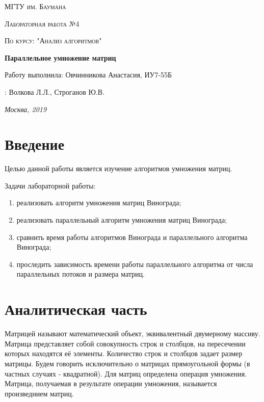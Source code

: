 \documentclass[a4paper,14pt]{report}
\begin{document}
\begin{titlepage}
	\centering
	{\scshape\LARGE МГТУ им. Баумана \par}
	\vspace{3cm}
	{\scshape\Large Лабораторная работа №4\par}
	\vspace{0.5cm}
	{\scshape\Large По курсу: "Анализ алгоритмов"\par}
	\vspace{1.5cm}
	{\huge\bfseries Параллельное умножение матриц\par}
	\vspace{2cm}
	\Large Работу выполнила: Овчинникова Анастасия, ИУ7-55Б\par
	\vspace{0.5cm}
	:  Волкова Л.Л., Строганов Ю.В.\par

	\vfill
	\large \textit {Москва, 2019} \par
\end{titlepage}

\tableofcontents

\newpage
\chapter*{Введение}

Целью данной работы является изучение алгоритмов умножения матриц.

Задачи лабораторной работы:
\begin{enumerate}
	\item реализовать алгоритм умножения матриц Винограда;
	\item реализовать параллельный алгоритм умножения матриц Винограда;
	\item сравнить время работы алгоритмов Винограда и параллельного алгоритма Винограда;
  \item проследить зависимость времени работы параллельного алгоритма от числа параллельных потоков и размера матриц.
\end{enumerate}


\chapter*{Аналитическая часть}

Матрицей называют математический объект, эквивалентный двумерному массиву. Матрица представляет собой совокупность строк и столбцов, на пересечении которых находятся её элементы. Количество строк и столбцов задает размер матрицы. Будем говорить исключительно о матрицах прямоугольной формы (в частных случаях - квадратной). Для матриц определена операция умножения. Матрица, получаемая в результате операции умножения, называется произведнием матриц.
\end{document}
